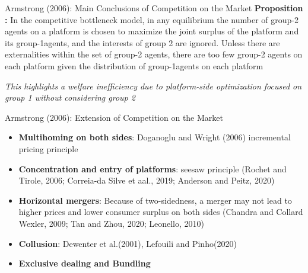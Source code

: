 \documentclass[aspectratio=169]{beamer}  %
\begin{document}
\begin{frame}{Armstrong (2006): Main Conclusions of Competition on the Market}
    \justifying  %
    \textbf{Proposition :}
    In the competitive bottleneck model, in any equilibrium the number of group-2 agents on a platform is chosen to maximize the joint surplus of the platform and its group-1agents, and the interests of group 2 are ignored. Unless there are externalities within the set of group-2 agents, there are too few group-2 agents on each platform given the distribution of group-1agents on each platform
    
    \vspace{1em}
    \textit{This highlights a welfare inefficiency due to platform-side optimization focused on group 1 without considering group 2}
    
    
\end{frame}

\begin{frame}{Armstrong (2006): Extension of Competition on the Market}
    \justifying  %
    
    \begin{itemize}
        \item \textbf{Multihoming on both sides}: Doganoglu and Wright (2006) incremental pricing principle
        \vspace{1em}
        \item \textbf{Concentration and entry of platforms}: seesaw principle (Rochet and Tirole, 2006; Correia-da Silve et aal., 2019; Anderson and Peitz, 2020)
        \vspace{1em}
        \item \textbf{Horizontal mergers}: Because of two-sidedness, a merger may not lead to higher prices and lower consumer surplus on both sides (Chandra and Collard Wexler, 2009; Tan and Zhou, 2020; Leonello, 2010)
        \vspace{1em}
        \item \textbf{Collusion}: Dewenter et al.(2001), Lefouili and Pinho(2020)
        \vspace{1em}
        \item \textbf{Exclusive dealing and Bundling}
    \end{itemize}
    
\end{frame}

\end{document}
